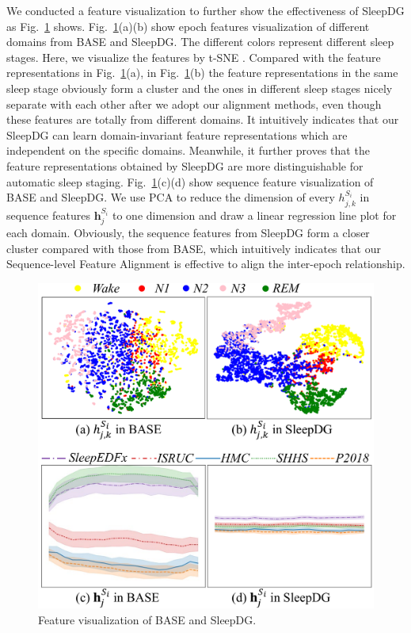 \documentclass[letterpaper]{article} %
\begin{document}
	We conducted a feature visualization to further show the effectiveness of SleepDG as Fig.~\ref{fig:Case} shows.
	Fig.~\ref{fig:Case}(a)(b) show epoch features visualization of different domains from BASE and SleepDG. The different colors represent different sleep stages.
	Here, we visualize the features by t-SNE \citep{van2008visualizing}.
	Compared with the feature representations in Fig.~\ref{fig:Case}(a), in Fig.~\ref{fig:Case}(b) the feature representations in the same sleep stage obviously form a cluster and the ones in different sleep stages nicely separate with each other after we adopt our alignment methods, even though these features are totally from different domains. It intuitively indicates that our SleepDG can learn domain-invariant feature representations which are independent on the specific domains.
	Meanwhile, it further proves that the feature representations obtained by SleepDG are more distinguishable for automatic sleep staging.
	Fig.~\ref{fig:Case}(c)(d) show sequence feature visualization of BASE and SleepDG.
	We use PCA to reduce the dimension of every $h^{S_i}_{j, k}$ in sequence features $\mathrm{\mathbf{h}}^{S_i}_j$ to one dimension and draw a linear regression line plot for each domain.
	Obviously, the sequence features from SleepDG form a closer cluster compared with those from BASE, which intuitively indicates that our Sequence-level Feature Alignment is effective to align the inter-epoch relationship.
	
\begin{figure}[tb]
	\centering
	\small
	\includegraphics[width=0.98\columnwidth]{case}
	\caption{Feature visualization of BASE and SleepDG.}
	\label{fig:Case}
\end{figure}
	
\end{document}
